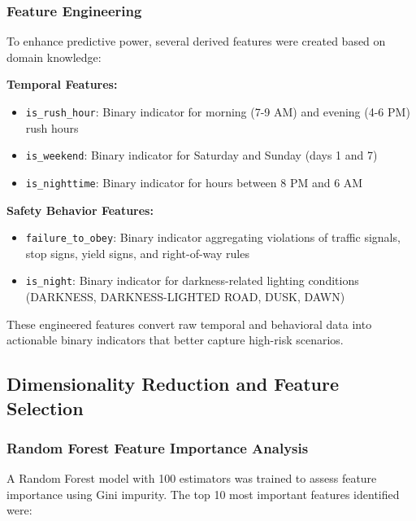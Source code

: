 \documentclass[12pt,man]{apa7}
\begin{document}
\subsubsection{Feature Engineering}

To enhance predictive power, several derived features were created based on domain knowledge:

\textbf{Temporal Features:}
\begin{itemize}
    \item \texttt{is\_rush\_hour}: Binary indicator for morning (7-9 AM) and evening (4-6 PM) rush hours
    \item \texttt{is\_weekend}: Binary indicator for Saturday and Sunday (days 1 and 7)
    \item \texttt{is\_nighttime}: Binary indicator for hours between 8 PM and 6 AM
\end{itemize}

\textbf{Safety Behavior Features:}
\begin{itemize}
    \item \texttt{failure\_to\_obey}: Binary indicator aggregating violations of traffic signals, stop signs, yield signs, and right-of-way rules
    \item \texttt{is\_night}: Binary indicator for darkness-related lighting conditions (DARKNESS, DARKNESS-LIGHTED ROAD, DUSK, DAWN)
\end{itemize}

These engineered features convert raw temporal and behavioral data into actionable binary indicators that better capture high-risk scenarios.

\subsection{Dimensionality Reduction and Feature Selection}

\subsubsection{Random Forest Feature Importance Analysis}

A Random Forest model with 100 estimators was trained to assess feature importance using Gini impurity. The top 10 most important features identified were:
\end{document}
